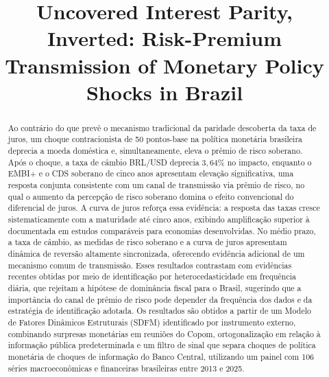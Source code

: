 \documentclass[preprint,authoryear,review,12pt]{elsarticle}
\begin{document}
\begin{frontmatter}
\title{Uncovered Interest Parity, Inverted: Risk-Premium Transmission of Monetary Policy Shocks in Brazil}




\begin{abstract}
Ao contrário do que prevê o mecanismo tradicional da paridade descoberta da taxa de juros, um choque contracionista de 50 pontos-base na política monetária brasileira deprecia a moeda doméstica e, simultaneamente, eleva o prêmio de risco soberano. Após o choque, a taxa de câmbio BRL/USD deprecia $3,\!64\%$ no impacto, enquanto o EMBI+ e o CDS soberano de cinco anos apresentam elevação significativa, uma resposta conjunta consistente com um canal de transmissão via prêmio de risco, no qual o aumento da percepção de risco soberano domina o efeito convencional do diferencial de juros. A curva de juros reforça essa evidência: a resposta das taxas cresce sistematicamente com a maturidade até cinco anos, exibindo amplificação superior à documentada em estudos comparáveis para economias desenvolvidas. No médio prazo, a taxa de câmbio, as medidas de risco soberano e a curva de juros apresentam dinâmica de reversão altamente sincronizada, oferecendo evidência adicional de um mecanismo comum de transmissão. Esses resultados contrastam com evidências recentes obtidas por meio de identificação por heterocedasticidade em frequência diária, que rejeitam a hipótese de dominância fiscal para o Brasil, sugerindo que a importância do canal de prêmio de risco pode depender da frequência dos dados e da estratégia de identificação adotada. Os resultados são obtidos a partir de um Modelo de Fatores Dinâmicos Estruturais (SDFM) identificado por instrumento externo, combinando surpresas monetárias em reuniões do Copom, ortogonalização em relação à informação pública predeterminada e um filtro de sinal que separa choques de política monetária de choques de informação do Banco Central, utilizando um painel com 106 séries macroeconômicas e financeiras brasileiras entre 2013 e 2025.\\


\end{abstract}
\end{frontmatter}
\end{document}
